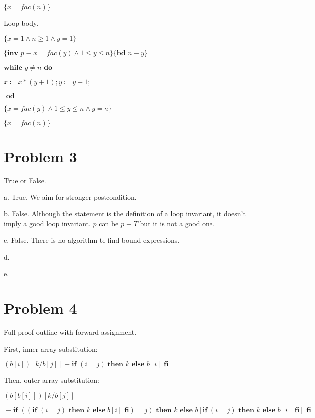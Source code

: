 \documentclass{article}
\begin{document}
$\{x=fac(n)\}$

\vspace{10pt}
Loop body.
\vspace{10pt}

$\{x=1 \wedge n \geq 1 \wedge y=1 \}$

$\{\textbf{inv }p \equiv x=fac(y) \wedge 1 \leq y \leq n \}\{\textbf{bd } n-y\}$

$ \textbf{while } y \neq n \textbf{ do }$

\qquad \qquad $x \coloneqq x*(y+1); y \coloneqq y+1;$

$\textbf{ od}$

$\{x=fac(y) \wedge 1 \leq y \leq n \wedge y=n\}$

$\{x=fac(n)\}$


\section*{Problem 3}

True or False.

\vspace{10pt}

a. True. We aim for stronger postcondition.

b. False. Although the statement is the definition of a loop invariant, it doesn't imply a good loop invariant. $p$ can be $p \equiv T$ but it is not a good one.

c. False. There is no algorithm to find bound expressions.

d. 

e.


\section*{Problem 4}

Full proof outline with forward assignment.

\vspace{10pt}

First, inner array substitution:

$ (b[i])[k/b[j]] \equiv \textbf{if } (i=j) \textbf{ then } k \textbf{ else } b[i] \textbf{ fi} $

\vspace{10pt}
Then, outer array substitution:

$ (b[b[i]])[k/b[j]] $

\qquad \qquad $ \equiv \textbf{if } ((\textbf{if } (i=j) \textbf{ then } k \textbf{ else } b[i] \textbf{ fi})=j) \textbf{ then } k \textbf{ else } b[\textbf{if } (i=j) \textbf{ then } k \textbf{ else } b[i] \textbf{ fi}] \textbf{ fi} $
\end{document}
